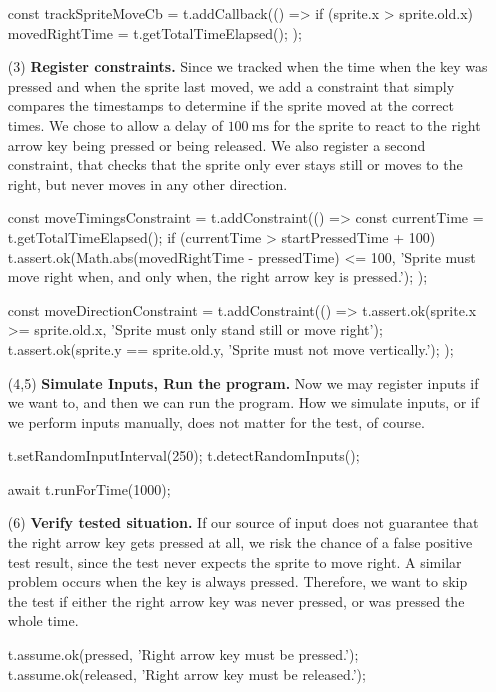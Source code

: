 \begin{enumerate}
\begin{javascriptcode}
            const trackSpriteMoveCb = t.addCallback(() => {
                if (sprite.x > sprite.old.x) {
                    movedRightTime = t.getTotalTimeElapsed();
                }
            });
        \end{javascriptcode}
    \item[(3)] \textbf{Register constraints.}
        Since we tracked when the time when the key was pressed and when the sprite last moved,
        we add a constraint that simply compares the timestamps to determine if the sprite moved at the correct times.
        We chose to allow a delay of $100~\text{ms}$ for the sprite to react to the right arrow key being pressed or being released.
        We also register a second constraint, that checks that the sprite only ever stays still or moves to the right,
        but never moves in any other direction.
        \begin{javascriptcode}
            const moveTimingsConstraint = t.addConstraint(() => {
                const currentTime = t.getTotalTimeElapsed();
                if (currentTime > startPressedTime + 100) {
                    t.assert.ok(Math.abs(movedRightTime - pressedTime) <= 100,
                        'Sprite must move right when, and only when, the right arrow key is pressed.');
                }
            });

            const moveDirectionConstraint = t.addConstraint(() => {
                t.assert.ok(sprite.x >= sprite.old.x,
                    'Sprite must only stand still or move right');
                t.assert.ok(sprite.y == sprite.old.y,
                    'Sprite must not move vertically.');
            });
        \end{javascriptcode}
    \item[(4,5)] \textbf{Simulate Inputs, Run the program.}
        Now we may register inputs if we want to, and then we can run the program.
        How we simulate inputs, or if we perform inputs manually, does not matter for the test, of course.
        \begin{javascriptcode}
            t.setRandomInputInterval(250);
            t.detectRandomInputs();

            await t.runForTime(1000);
        \end{javascriptcode}
    \item[(6)] \textbf{Verify tested situation.}
        If our source of input does not guarantee that the right arrow key gets pressed at all, we risk the chance of a false positive test result,
        since the test never expects the sprite to move right.
        A similar problem occurs when the key is always pressed.
        Therefore, we want to skip the test if either the right arrow key was never pressed,
        or was pressed the whole time.
        \begin{javascriptcode}
            t.assume.ok(pressed, 'Right arrow key must be pressed.');
            t.assume.ok(released, 'Right arrow key must be released.');
        \end{javascriptcode}
\end{enumerate}
\parspace

